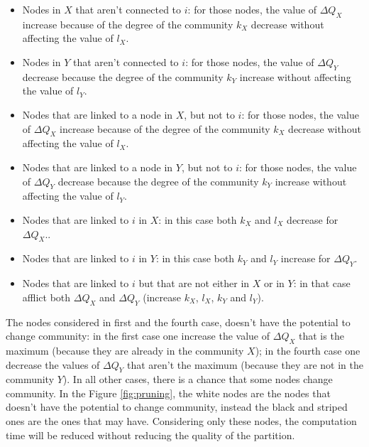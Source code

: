 \begin{itemize}
	\item Nodes in $X$ that aren't connected to $i$:  for those nodes, the value of $\Delta Q_X$ increase because of the degree of the community $k_X$ decrease without affecting the value of $l_X$.
	\item Nodes in $Y$ that aren't connected to $i$: for those nodes, the value of $\Delta Q_Y$ decrease because the degree of the community $k_Y$ increase without affecting the value of $l_Y$.
	\item  Nodes that are linked to a node in $X$, but not to $i$: for those nodes, the value of $\Delta Q_X$ increase because of the degree of the community $k_X$ decrease without affecting the value of $l_X$.
	\item  Nodes that are linked to a node in $Y$, but not to $i$: for those nodes, the value of $\Delta Q_Y$ decrease because the degree of the community $k_Y$ increase without affecting the value of $l_Y$.
	\item Nodes that are linked to $i$ in $X$:
	in this case both $k_X$ and $l_X$ decrease for $\Delta Q_X$..
	\item Nodes that are linked to $i$ in $Y$:
	in this case both $k_Y$ and $l_Y$ increase for $\Delta Q_Y$.
	\item Nodes that are linked to $i$ but that are not either in $X$ or in $Y$:
	in that case afflict both $\Delta Q_X$ and $\Delta Q_Y$ (increase $k_X$, $l_X$, $k_Y$ and $l_Y$).
\end{itemize} 
The nodes considered in first and the fourth case, doesn't have the potential to change community: in the first case one increase the value of $\Delta Q_X$ that is the maximum (because they are already in the community $X$); in the fourth case one decrease the values of $\Delta Q_Y$ that aren't the maximum (because they are not in the community $Y$). In all other cases, there is a chance that some nodes change community. In the Figure \ref{fig:pruning}, the white nodes are the nodes that doesn't have the potential to change community, instead the black and striped ones are the ones that may have. Considering only these nodes, the computation time will be reduced without reducing the quality of the partition.
